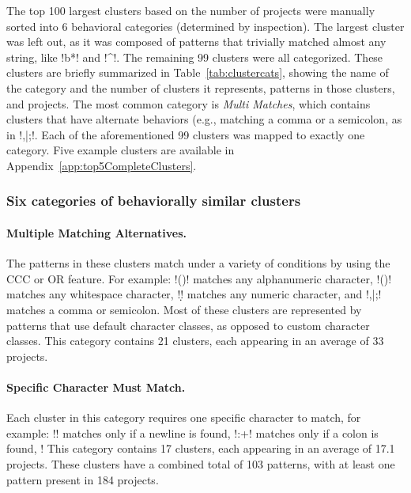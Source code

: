 

The top 100 largest clusters based on the number of projects were manually sorted into 6 behavioral categories (determined by inspection).  The largest cluster was left out, as it was composed of patterns that trivially matched almost any string, like \cverb!b*! and \cverb!^!.  The remaining 99 clusters were all categorized. These clusters are briefly summarized in Table~\ref{tab:clustercats}, showing the name of the category and the number of clusters it represents, patterns in those clusters, and projects. The most common category is \emph{Multi Matches}, which contains clusters that have alternate behaviors (e.g., matching a comma or a semicolon, as in \cverb!,|;!. Each of the aforementioned 99 clusters was mapped to exactly one category.  Five example clusters are available in Appendix~\ref{app:top5CompleteClusters}.


\subsubsection{Six categories of behaviorally similar clusters}
\label{sec:categoriesDefined}
\paragraph{Multiple Matching Alternatives.}
The patterns in these clusters match under a variety of conditions by using the CCC or OR feature.  For example: \cverb!(\W)! matches any alphanumeric character, \cverb!(\s)! matches any whitespace character, \cverb!\d! matches any numeric character, and \cverb!,|;! matches a comma or semicolon.  Most of these clusters are represented by patterns that use default character classes, as opposed to custom character classes.  This category contains 21 clusters, each appearing in an average of 33 projects.

\paragraph{Specific Character Must Match.}
\label{cluster:single}
Each cluster in this category requires one specific character to match, for example:
\cverb!\n\s*! matches only if a newline is found, \cverb!:+! matches only if a colon is found, \cverb!%
This category contains 17 clusters, each appearing in an average of 17.1 projects.
These clusters have a combined total of 103 patterns, with at least one pattern present in 184 projects.

